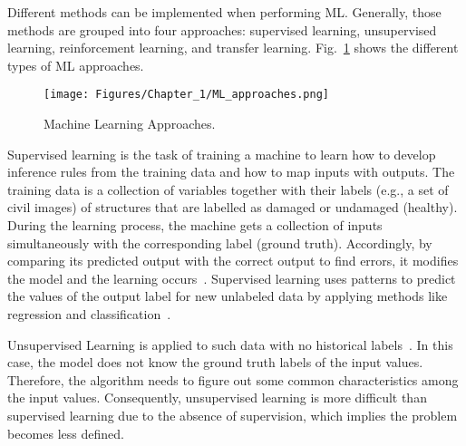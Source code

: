 Different methods can be implemented when performing ML.
Generally, those methods are grouped into four approaches: supervised learning, unsupervised learning, reinforce\-ment learning, and transfer learning.
Fig.~\ref{fig:Machine_learning_approaches} shows the different types of ML approaches.
\begin{figure} [!ht]
	\begin{center}
		\centering
		\texttt{[image: Figures/Chapter\_1/ML\_approaches.png]}
	\end{center}
	\caption{Machine Learning Approaches.} 
	\label{fig:Machine_learning_approaches}
\end{figure}

Supervised learning is the task of training a machine to learn how to develop inference rules from the training data and how to map inputs with outputs.
The training data is a collection of variables together with their labels (e.g., a set of civil images) of structures that are labelled as damaged or undamaged (healthy).
During the learning process, the machine gets a collection of inputs simultaneously with the corresponding label (ground truth).
Accordingly, by comparing its predicted output with the correct output to find errors, it modifies the model and the learning occurs~\cite{Ongsulee2018}. 
Supervised learning uses patterns to predict the values of the output label for new unlabeled data by applying methods like regression and classification~\cite{Ongsulee2018}. 

Unsupervised Learning is applied to such data with no historical labels~\cite{Ongsulee2018}. 
In this case, the model does not know the ground truth labels of the input values. Therefore, the algorithm needs to figure out some common characteristics among the input values.
Consequently, unsupervised learning is more difficult than supervised learning due to the absence of supervision, which implies the problem becomes less defined.

